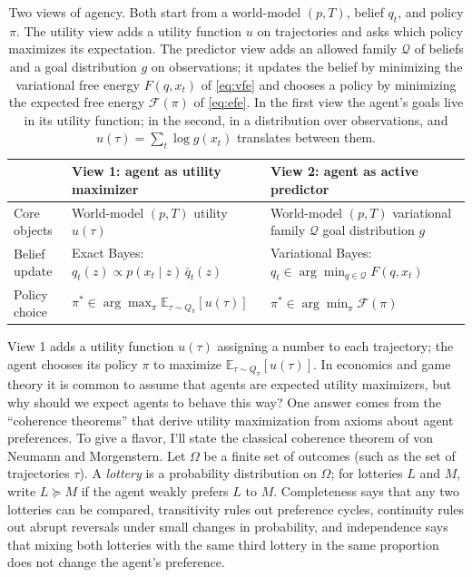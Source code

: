 \begin{table}[tbp]
\centering
\small
\renewcommand{\arraystretch}{1.3}
\setlength{\tabcolsep}{4pt}
\begin{tabular}{@{}>{\raggedright\arraybackslash}p{}>{\raggedright\arraybackslash}p{}>{\raggedright\arraybackslash}p{}@{}}
& \textbf{View 1: agent as utility maximizer} & \textbf{View 2: agent as active predictor}\\
\hline
Core objects & World-model $(p,T)$ \newline utility $u(\tau)$ & World-model $(p,T)$ \newline variational family $\mathcal Q$ \newline goal distribution $g$\\
\hline
Belief update & Exact Bayes: \newline $q_t(z)\propto p(x_t\mid z)\,\bar q_t(z)$ & Variational Bayes: \newline $q_t\in\arg\min_{q\in\mathcal Q}F(q,x_t)$\\
\hline
Policy choice & $\pi^*\in\arg\max_\pi \mathbb{E}_{\tau\sim Q_\pi}[u(\tau)]$ & $\pi^*\in\arg\min_\pi \mathcal F(\pi)$\\
\hline
\end{tabular}
\caption{Two views of agency. Both start from a world-model $(p,T)$, belief $q_t$, and policy $\pi$. The utility view adds a utility function $u$ on trajectories and asks which policy maximizes its expectation. The predictor view adds an allowed family $\mathcal Q$ of beliefs and a goal distribution $g$ on observations; it updates the belief by minimizing the variational free energy $F(q,x_t)$ of \eqref{eq:vfe} and chooses a policy by minimizing the expected free energy $\mathcal F(\pi)$ of \eqref{eq:efe}. In the first view the agent's goals live in its utility function; in the second, in a distribution over observations, and $u(\tau)=\sum_t\log g(x_t)$ translates between them.}
\label{tab:twoviews}
\end{table}

View 1 adds a utility function $u(\tau)$ assigning a number to each trajectory; the agent chooses its policy $\pi$ to maximize $\mathbb{E}_{\tau\sim Q_\pi}[u(\tau)]$. In economics and game theory it is common to assume that agents are expected utility maximizers, but why should we expect agents to behave this way? One answer comes from the ``coherence theorems'' that derive utility maximization from axioms about agent preferences. To give a flavor, I'll state the classical coherence theorem of von Neumann and Morgenstern. Let $\Omega$ be a finite set of outcomes (such as the set of trajectories $\tau$). A \emph{lottery} is a probability distribution on $\Omega$; for lotteries $L$ and $M$, write $L\succeq M$ if the agent weakly prefers $L$ to $M$. Completeness says that any two lotteries can be compared, transitivity rules out preference cycles, continuity rules out abrupt reversals under small changes in probability, and independence says that mixing both lotteries with the same third lottery in the same proportion does not change the agent's preference.

